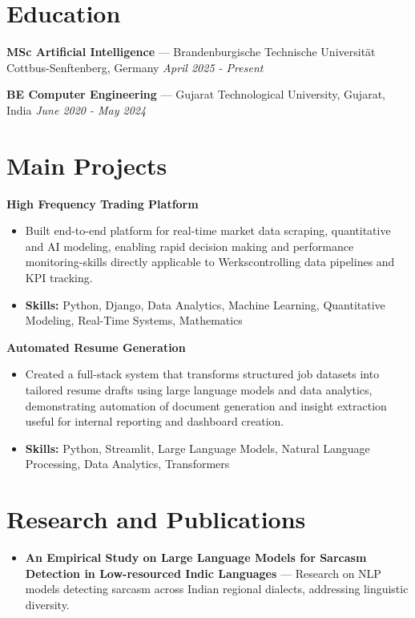 \documentclass[a4paper,10pt]{article}
\begin{document}
\section*{Education}
\textbf{MSc Artificial Intelligence} — Brandenburgische Technische Universität Cottbus-Senftenberg, Germany \hfill \textit{April 2025 - Present}\par
\vspace{1.5pt}
\textbf{BE Computer Engineering} — Gujarat Technological University, Gujarat, India \hfill \textit{June 2020 - May 2024}\par

\section*{Main Projects}
\textbf{High Frequency Trading Platform}\par
\vspace{1pt}
\begin{itemize}
  \item Built end-to-end platform for real-time market data scraping, quantitative and AI modeling, enabling rapid decision making and performance monitoring-skills directly applicable to Werkscontrolling data pipelines and KPI tracking.
  \item \textbf{Skills:} Python, Django, Data Analytics, Machine Learning, Quantitative Modeling, Real-Time Systems, Mathematics
\end{itemize}
\vspace{3pt}
\textbf{Automated Resume Generation}\par
\vspace{1pt}
\begin{itemize}
  \item Created a full-stack system that transforms structured job datasets into tailored resume drafts using large language models and data analytics, demonstrating automation of document generation and insight extraction useful for internal reporting and dashboard creation.
  \item \textbf{Skills:} Python, Streamlit, Large Language Models, Natural Language Processing, Data Analytics, Transformers
\end{itemize}

\section*{Research and Publications}
\begin{itemize}
\item \textbf{An Empirical Study on Large Language Models for Sarcasm Detection in Low-resourced Indic Languages} — Research on NLP models detecting sarcasm across Indian regional dialects, addressing linguistic diversity.
\end{itemize}
\end{document}
